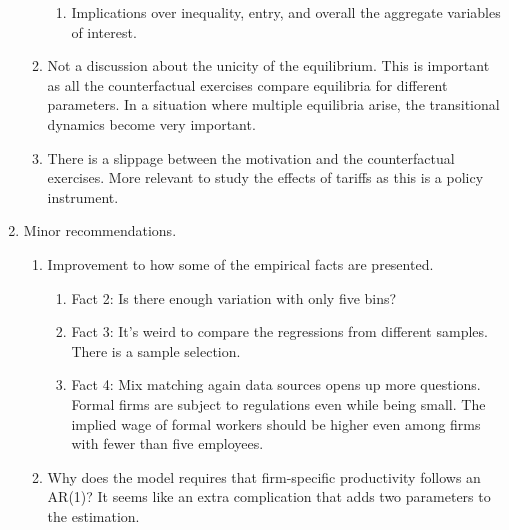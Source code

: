 \documentclass[12pt,oneside,reqno]{amsart}
\begin{document}
\begin{enumerate}[leftmargin=0pt, label=\textbf{\arabic*.}]
\begin{enumerate}[label=\textbf{\alph*)}]
\begin{enumerate}[label=\textbf{\roman*.}]
            \item Implications over inequality, entry, and overall the aggregate variables of interest. 
        \end{enumerate}
        \item Not a discussion about the unicity of the equilibrium. This is important as all the counterfactual exercises compare equilibria for different parameters. In a situation where multiple equilibria arise, the transitional dynamics become very important. 
        \item There is a slippage between the motivation and the counterfactual exercises. More relevant to study the effects of tariffs as this is a policy instrument. 
    \end{enumerate}
    \item Minor recommendations. 
    \begin{enumerate}[label=\textbf{\alph*)}]
        \item Improvement to how some of the empirical facts are presented. 
        \begin{enumerate}[label=\textbf{\roman*.}]
            \item Fact 2: Is there enough variation with only five bins?
            \item Fact 3: It's weird to compare the regressions from different samples. There is a sample selection. 
            \item Fact 4: Mix matching again data sources opens up more questions. Formal firms are subject to regulations even while being small. The implied wage of formal workers should be higher even among firms with fewer than five employees. 
        \end{enumerate}
        \item Why does the model requires that firm-specific productivity follows an AR(1)? It seems like an extra complication that adds two parameters to the estimation. 
        
    \end{enumerate}
\end{enumerate}
\end{document}
